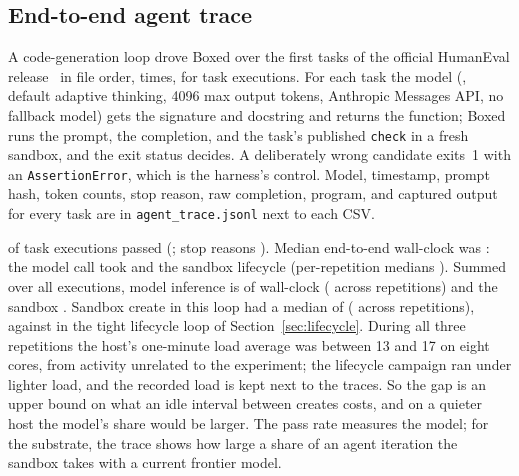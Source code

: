 \documentclass[conference]{IEEEtran}
\begin{document}
\subsection{End-to-end agent trace}\label{sec:agent}
A code-generation loop drove Boxed over the first \BoxedAgentTasksPerRep{}
tasks of the official HumanEval release~\cite{humaneval} in file order,
\BoxedAgentReps{} times, for \BoxedAgentN{} task executions. For each
task the model (\texttt{\BoxedAgentModel}, default adaptive thinking,
4096 max output tokens, Anthropic Messages API, no fallback model) gets the
signature and docstring and returns the function; Boxed runs the prompt,
the completion, and the task's published \texttt{check} in a fresh
sandbox, and the exit status decides. A deliberately wrong candidate exits~1
with an \texttt{AssertionError}, which is the harness's control. Model, timestamp, prompt hash, token
counts, stop reason, raw completion, program, and captured output for every
task are in \texttt{agent\_trace.jsonl} next to each CSV.

\BoxedAgentPassCount{} of \BoxedAgentN{} task executions passed
(\BoxedAgentPass; stop reasons \BoxedAgentStopReasons). Median end-to-end
wall-clock was \BoxedAgentMedianTotal{}: the model call took
\BoxedAgentLLMMedian{} and the sandbox lifecycle \BoxedAgentSandboxMedian{}
(per-repetition medians \BoxedAgentSandboxRepRange).
Summed over all executions, model inference is \BoxedAgentLLMShare{} of
wall-clock (\BoxedAgentLLMShareRepRange{} across repetitions) and the
sandbox \BoxedAgentSandboxShare{}. Sandbox create in this loop had a median
of \BoxedAgentCreateMedian{} (\BoxedAgentCreateRepRange{} across
repetitions), against \BoxedColdCreateMedian{} in the tight lifecycle loop
of Section~\ref{sec:lifecycle}. During all three repetitions the host's
one-minute load average was between 13 and 17 on eight cores, from activity
unrelated to the experiment; the lifecycle campaign ran under lighter load,
and the recorded load is kept next to the traces. So the gap is an upper
bound on what an idle interval between creates costs, and on a quieter host
the model's share would be larger. The pass rate measures the model; for the substrate, the trace shows how
large a share of an agent iteration the sandbox takes with a current
frontier model.
\end{document}
